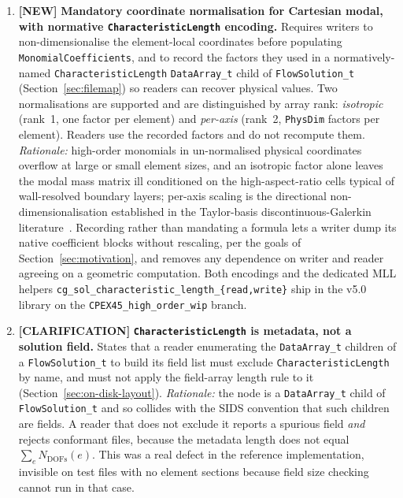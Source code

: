 \documentclass[11pt,letterpaper]{article}
\newcommand{\NEW}{\textcolor{newgreen}{\textbf{[NEW]}}}
\newcommand{\CLARIFY}{\textcolor{clarifybrown}{\textbf{[CLARIFICATION]}}}
\begin{document}
{\begin{enumerate}[nosep,leftmargin=1.5em]
  \item \NEW{} \textbf{Mandatory coordinate normalisation for Cartesian modal,
    with normative \texttt{CharacteristicLength} encoding.}
    Requires writers to non-dimensionalise the element-local coordinates before
    populating \texttt{MonomialCoefficients}, and to record the factors they used in
    a normatively-named \texttt{CharacteristicLength} \texttt{DataArray\_t} child of
    \texttt{FlowSolution\_t} (Section~\ref{sec:filemap}) so readers can recover
    physical values.  Two normalisations are supported and are distinguished by array
    rank: \emph{isotropic} (rank~1, one factor per element) and \emph{per-axis}
    (rank~2, \texttt{PhysDim} factors per element).  Readers use the recorded factors
    and do not recompute them.
    \textit{Rationale:} high-order monomials in un-normalised physical coordinates
    overflow at large or small element sizes, and an isotropic factor alone leaves the
    modal mass matrix ill conditioned on the high-aspect-ratio cells typical of
    wall-resolved boundary layers; per-axis scaling is the directional
    non-dimensionalisation established in the Taylor-basis discontinuous-Galerkin
    literature~\cite{LuoBaumLohner08,Kuzmin20}.  Recording rather than mandating a
    formula lets a writer dump its native coefficient blocks without rescaling, per the
    goals of Section~\ref{sec:motivation}, and removes any dependence on writer and
    reader agreeing on a geometric computation.  Both encodings and the dedicated MLL
    helpers \texttt{cg\_sol\_characteristic\_length\_\{read,write\}} ship in the v5.0
    library on the \texttt{CPEX45\_high\_order\_wip} branch.

  \item \CLARIFY{} \textbf{\texttt{CharacteristicLength} is metadata, not a solution
    field.}  States that a reader enumerating the \texttt{DataArray\_t} children of a
    \texttt{FlowSolution\_t} to build its field list must exclude
    \texttt{CharacteristicLength} by name, and must not apply the field-array length
    rule to it (Section~\ref{sec:on-disk-layout}).  \textit{Rationale:} the node is a
    \texttt{DataArray\_t} child of \texttt{FlowSolution\_t} and so collides with the
    SIDS convention that such children are fields.  A reader that does not exclude it
    reports a spurious field \emph{and} rejects conformant files, because the metadata
    length does not equal $\sum_e N_\mathrm{DOFs}(e)$.  This was a real defect in the
    reference implementation, invisible on test files with no element sections because
    field size checking cannot run in that case.


\end{enumerate}}
\end{document}
